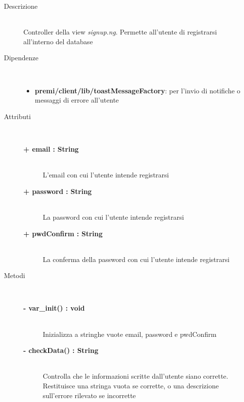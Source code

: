 \begin{description}
\item[Descrizione] \hfill \\
	Controller della view \textit{signup.ng}. Permette all'utente di registrarsi all'interno del database
	
	
	
\item[Dipendenze] \hfill \\
	\begin{itemize}
		\item \textbf{premi/client/lib/toastMessageFactory}: per l'invio di notifiche o messaggi di errore all'utente
	\end{itemize}
	
	
\item[Attributi] \hfill \\
	\begin{description}
		\item[\textbf{+ email : String			}] \hfill \\
			L'email con cui l'utente intende registrarsi
		\item[\textbf{+ password : String			}] \hfill \\
			La password con cui l'utente intende registrarsi
		\item[\textbf{+ pwdConfirm : String			}] \hfill \\
			La conferma della password con cui l'utente intende registrarsi
	\end{description}
	
	
\item[Metodi] \hfill \\

	\begin{description}
		\item[\textbf{\color{blue}- var\_init() : void			}] \hfill \\
			Inizializza a stringhe vuote email, password e pwdConfirm
	\end{description}
	
	\begin{description}
		\item[\textbf{\color{blue}- checkData() : String			}] \hfill \\
			Controlla che le informazioni scritte dall'utente siano corrette. Restituisce una stringa vuota se corrette, o una descrizione sull'errore rilevato se incorrette
	\end{description}
	

\end{description}
